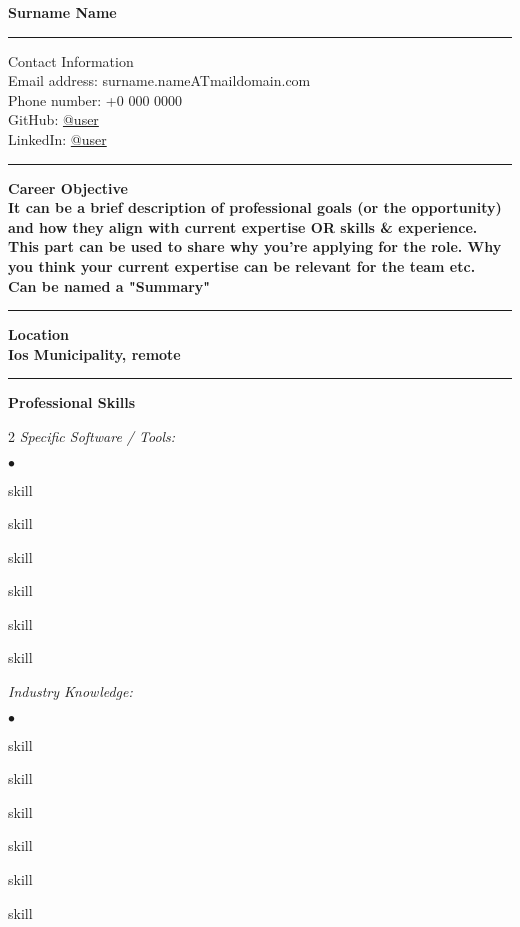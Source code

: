 \documentclass[oneside,final,10pt]{extreport}
\newenvironment{compactlist}{
	\begin{list}{{$\bullet$}}{
		\setlength\leftmargin{0.4cm}
		\setlength\partopsep{0pt}
		\setlength\parskip{0pt}
		\setlength\parsep{0pt}
		\setlength\topsep{0pt}
		\setlength\itemsep{0pt}
	}
}{
	\end{list}
}
\begin{document}
\bfseries
Surname Name \\
\rule{\textwidth}{0.4pt}
Contact Information \\
\noindent
\mdseries
Email address: 
surname.nameATmaildomain.com \\
Phone number: 
+0 000 0000 \\
GitHub:
\href{https://github.com/user}{@user} \\
LinkedIn:
\href{https://www.linkedin.com/in/username}{@user} \\
\rule{\textwidth}{0.4pt}

\bfseries
Career Objective \\
\mdseries
It can be a brief description of professional goals (or the opportunity) and how they align with current expertise OR skills \& experience. \\
This part can be used to share why you're applying for the role. Why you think your current expertise can be relevant for the team etc. \\
Can be named  a "Summary" \\[5pt]
\rule{\textwidth}{0.4pt}

\bfseries
Location \\
\mdseries
Ios Municipality, remote \\
\rule{\textwidth}{0.4pt}

\bfseries
Professional Skills
\mdseries
\begin{multicols}{2}
\textsl{Specific Software / Tools:}
	 \begin{compactlist}
		 \item skill
		 \item skill
		 \item skill
		 \item skill
		 \item skill
		 \item skill
	 \end{compactlist}
\textsl{Industry Knowledge:}
	 \begin{compactlist}
		 \item skill
		 \item skill
		 \item skill
		 \item skill
		 \item skill
		 \item skill
	 \end{compactlist}
\end{multicols}
\end{document}
